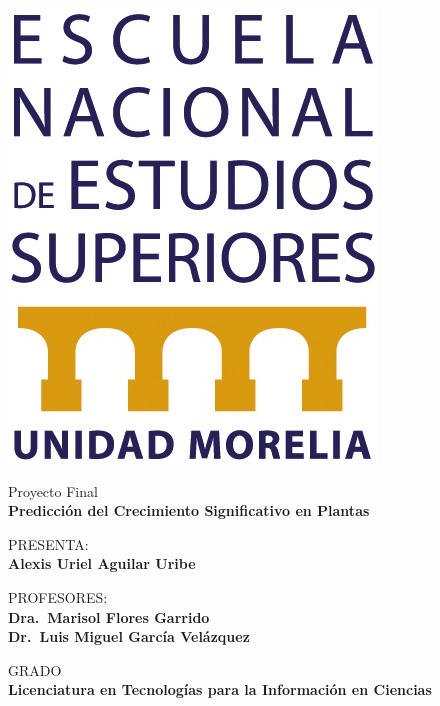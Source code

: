 \documentclass[12pt,a4paper]{article}
\begin{document}
\begin{titlepage}
\begin{minipage}[c]{0.1\textwidth}
            \includegraphics[width=\textwidth]{./Resources/logo_enes.jpg}
        \end{minipage}
        \vspace{3cm}

        \centering

        {\large{Proyecto Final\\}}
        {\Large\textbf{Predicción del Crecimiento Significativo en Plantas}}
        \vspace{2cm}

        {{PRESENTA:\\}}
        {\large\textbf{Alexis Uriel Aguilar Uribe}}
        \vspace{1cm} 

        {{PROFESORES:\\}}
        {\large\textbf{Dra.\ Marisol Flores Garrido}}\\
        {\large\textbf{Dr.\ Luis Miguel García Velázquez}}
        \vspace{2cm}

        {{GRADO\\}}
        {\large\textbf{Licenciatura en Tecnologías para la Información en Ciencias}}
        \vspace{2cm}

        \vspace{2cm}

        \vfill

    \end{titlepage}
\end{document}
